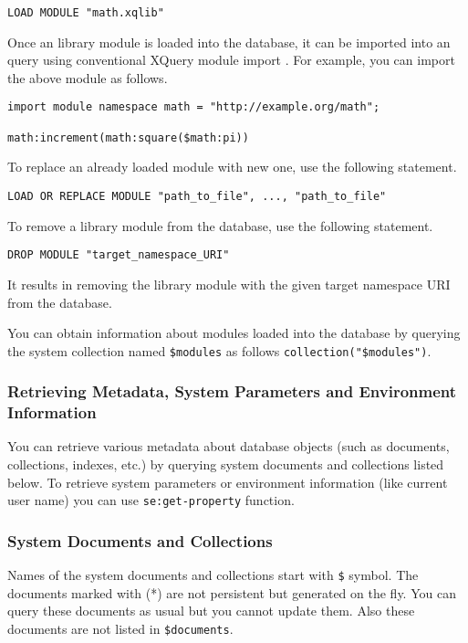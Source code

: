 \documentclass[a4paper,12pt]{article}
\begin{document}
\begin{verbatim}
LOAD MODULE "math.xqlib"
\end{verbatim}

Once an library module is loaded into the database, it can be imported into an query using conventional XQuery module import \cite{paper:query-language}. For example, you can import the above module as follows.

\begin{verbatim}
import module namespace math = "http://example.org/math";

math:increment(math:square($math:pi))

\end{verbatim}


To replace an already loaded module with new one, use the following statement.

\begin{verbatim}
LOAD OR REPLACE MODULE "path_to_file", ..., "path_to_file"
\end{verbatim}

To remove a library module from the database, use the following statement.

\begin{verbatim}
DROP MODULE "target_namespace_URI"
\end{verbatim}

It results in removing the library module with the given target namespace URI from the database.

You can obtain information about modules loaded into the database by querying the system collection named \verb!$modules! as follows \verb!collection("$modules")!.


\subsubsection{Retrieving Metadata, System Parameters and Environment Information}
\label{managing-metadata}
You can retrieve various metadata about database objects (such as documents, collections, indexes, etc.) by querying system documents and collections listed below. 
To retrieve system parameters or environment information (like current user name) you can use \verb!se:get-property! function.

\subsubsection*{System Documents and Collections}

Names of the system documents and collections start with \verb!$! symbol. The documents marked with (*) are not persistent but generated on the fly. You can query these documents as usual but you cannot update them.
Also these documents are not listed in \verb!$documents!.
\end{document}
